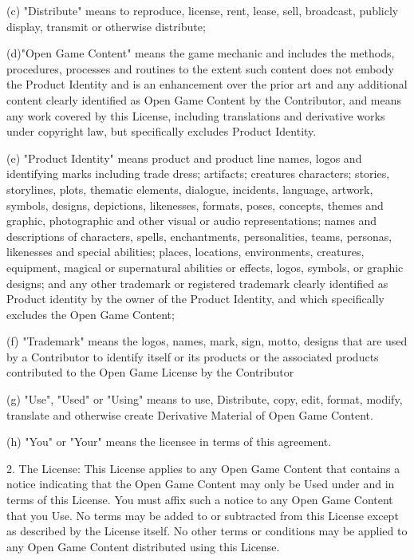 \documentclass[11pt]{article}
\begin{document}
{\bigskip

(c) "Distribute" means to reproduce, license, rent, lease, sell, broadcast, publicly display, transmit or otherwise distribute;

\bigskip

(d)"Open Game Content" means the game mechanic and includes the methods, procedures, processes and routines to the extent such content does not embody the Product Identity and is an enhancement over the prior art and any additional content clearly identified as Open Game Content by the Contributor, and means any work covered by this License, including translations and derivative works under copyright law, but specifically excludes Product Identity.

\bigskip

(e) "Product Identity" means product and product line names, logos and identifying marks including trade dress; artifacts; creatures characters; stories, storylines, plots, thematic elements, dialogue, incidents, language, artwork, symbols, designs, depictions, likenesses, formats, poses, concepts, themes and graphic, photographic and other visual or audio representations; names and descriptions of characters, spells, enchantments, personalities, teams, personas, likenesses and special abilities; places, locations, environments, creatures, equipment, magical or supernatural abilities or effects, logos, symbols, or graphic designs; and any other trademark or registered trademark clearly identified as Product identity by the owner of the Product Identity, and which specifically excludes the Open Game Content;

\bigskip

(f) "Trademark" means the logos, names, mark, sign, motto, designs that are used by a Contributor to identify itself or its products or the associated products contributed to the Open Game License by the Contributor

\bigskip

(g) "Use", "Used" or "Using" means to use, Distribute, copy, edit, format, modify, translate and otherwise create Derivative Material of Open Game Content.

\bigskip

(h) "You" or "Your" means the licensee in terms of this agreement.

\bigskip

2. The License: This License applies to any Open Game Content that contains a notice indicating that the Open Game Content may only be Used under and in terms of this License. You must affix such a notice to any Open Game Content that you Use. No terms may be added to or subtracted from this License except as described by the License itself. No other terms or conditions may be applied to any Open Game Content distributed using this License.

}
\end{document}
